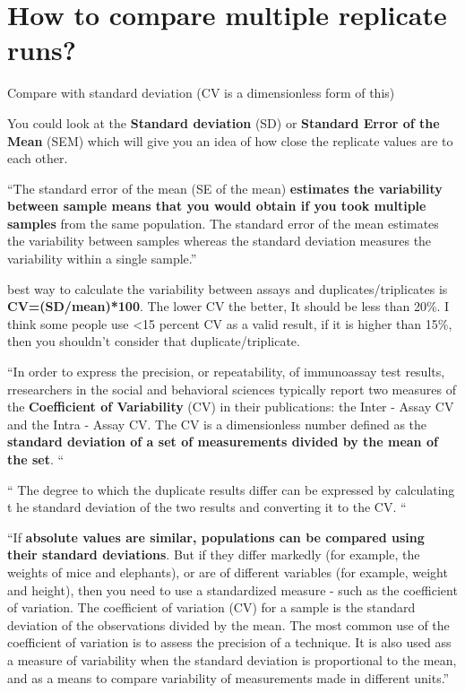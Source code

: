 \section{How to compare multiple replicate runs?}

Compare with standard deviation (CV is a dimensionless form of this)

You could look at the\textbf{ Standard deviation} (SD) or \textbf{Standard Error of the Mean} (SEM) which will give you an idea of how close the replicate values are to each other.  


``The standard error of the mean (SE of the mean) \textbf{estimates the variability between sample means that you would obtain if you took multiple samples} from the same population. The standard error of the mean estimates the variability between samples whereas the standard deviation measures the variability within a single sample.''

best way to calculate the variability between assays and duplicates/triplicates is \textbf{CV=(SD/mean)*100}. The lower CV the better, It should be less than 20\%. 
I think some people use <15 percent CV as a valid result, if it is higher than 15\%, then you shouldn't consider that duplicate/triplicate.

``In order to express the precision, or repeatability, of immunoassay test results, rresearchers in the social and  behavioral sciences typically report two measures of the \textbf{Coefficient of Variability}  (CV) in their publications:  the  Inter - Assay CV and the Intra - Assay CV.  The CV is a dimensionless number defined as the \textbf{standard deviation of a  set of measurements divided by the mean of the set}. ``

`` The degree to which the duplicate results differ 
can be expressed by calculating t
he standard deviation of the two results and converting it to the CV. ``
\cite{https://www.salimetrics.com/assets/documents/Spit_Tips_-_Inter__Intra_Assay_Coefficients_of_Variability.pdf}


``If \textbf{absolute values are similar, populations can be compared using their standard deviations}. But if they differ markedly (for example, the weights of mice and elephants), or are of different variables (for example, weight and height), then you need to use a standardized measure - such as the coefficient of variation. The coefficient of variation (CV) for a sample is the standard deviation of the observations divided by the mean. The most common use of the coefficient of variation is to assess the precision of a technique. It is also used ass a measure of variability when the standard deviation is proportional to the mean, and as a means to compare variability of measurements made in different units.''
\cite {https://www.researchgate.net/post/How_to_calculate_the_inter_assay_and_intra_assay_vatiations }



